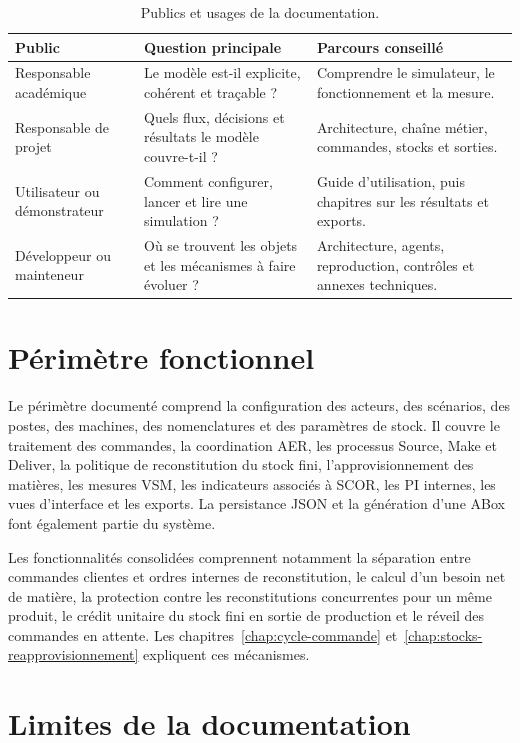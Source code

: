 \begin{table}[H]
  \centering
  \begin{tabularx}{\textwidth}{L{0.23\textwidth} Y Y}
    \toprule
    Public & Question principale & Parcours conseillé \\
    \midrule
    Responsable académique & Le modèle est-il explicite, cohérent et traçable ? & Comprendre le simulateur, le fonctionnement et la mesure. \\
    Responsable de projet & Quels flux, décisions et résultats le modèle couvre-t-il ? & Architecture, chaîne métier, commandes, stocks et sorties. \\
    Utilisateur ou démonstrateur & Comment configurer, lancer et lire une simulation ? & Guide d'utilisation, puis chapitres sur les résultats et exports. \\
    Développeur ou mainteneur & Où se trouvent les objets et les mécanismes à faire évoluer ? & Architecture, agents, reproduction, contrôles et annexes techniques. \\
    \bottomrule
  \end{tabularx}
  \caption{Publics et usages de la documentation.}
  \label{tab:publics-usages}
\end{table}

\section{Périmètre fonctionnel}

Le périmètre documenté comprend la configuration des acteurs, des scénarios, des postes, des machines, des nomenclatures et des paramètres de stock. Il couvre le traitement des commandes, la coordination AER, les processus Source, Make et Deliver, la politique de reconstitution du stock fini, l'approvisionnement des matières, les mesures VSM, les indicateurs associés à SCOR, les PI internes, les vues d'interface et les exports. La persistance JSON et la génération d'une ABox font également partie du système.

Les fonctionnalités consolidées comprennent notamment la séparation entre commandes clientes et ordres internes de reconstitution, le calcul d'un besoin net de matière, la protection contre les reconstitutions concurrentes pour un même produit, le crédit unitaire du stock fini en sortie de production et le réveil des commandes en attente. Les chapitres~\ref{chap:cycle-commande} et~\ref{chap:stocks-reapprovisionnement} expliquent ces mécanismes.

\section{Limites de la documentation}

